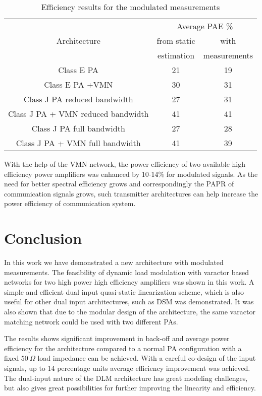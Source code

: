 \documentclass[10pt,journal]{IEEEtran}
\begin{document}
\begin{table}
\centering
\caption{Efficiency results for the modulated measurements}
\begin{tabular}{c|c|c}

& \multicolumn{2}{c}{Average PAE \%}\\
   Architecture&from static& with\\
   &estimation&measurements\\
   \hline
   \hline
   Class E PA&21&19\\
   Class E PA +VMN & 30&31\\
   \hline
   Class J PA reduced bandwidth&27&31\\
   Class J PA + VMN reduced bandwidth&41&41\\
   \hline
   Class J PA full bandwidth&27&28\\
   Class J PA + VMN full bandwidth&41&39\\
   \end{tabular}
   \label{results}
\end{table}

With the help of the VMN network, the power efficiency of two available high efficiency power amplifiers was enhanced by 10-14\% for modulated signals. As the need for better spectral efficiency grows and correspondingly the PAPR of communication signals grows, such transmitter architectures can help increase the power efficiency of communication system.

\section{Conclusion}

In this work we have demonstrated a new architecture with modulated measurements. The feasibility of dynamic load modulation with varactor based networks for two high power high efficiency amplifiers was shown in this work. A simple and efficient dual input quasi-static linearization scheme, which is also useful for other dual input architectures, such as DSM was demonstrated. It was also shown that due to the modular design of the architecture, the same varactor matching network could be used with two different PAs.

The results shows significant improvement in back-off and average power efficiency for the architecture compared to a normal PA configuration with a fixed $50~\Omega$ load impedance can be achieved. With a careful co-design of the input signals, up to 14 percentage units average efficiency improvement was achieved. The dual-input nature of the DLM architecture has great modeling challenges, but also gives great possibilities for further improving the linearity and efficiency.





\end{document}
